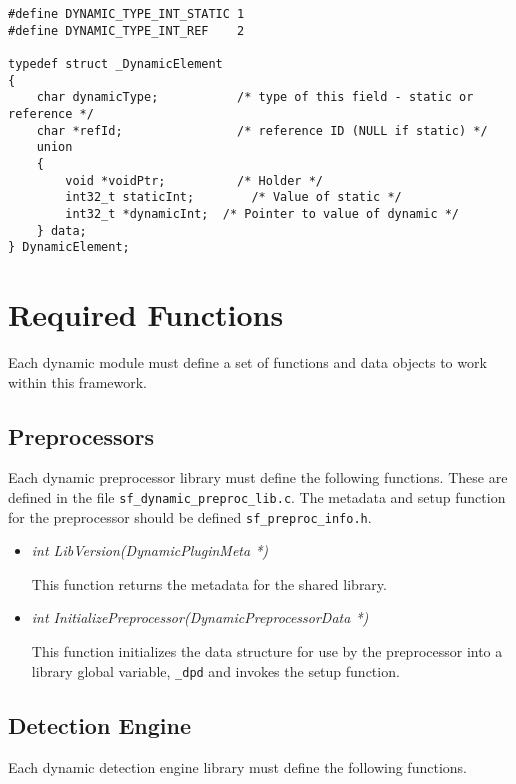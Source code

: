 \documentclass[english]{report}
\begin{document}
\begin{itemize}
\begin{verbatim}
#define DYNAMIC_TYPE_INT_STATIC 1
#define DYNAMIC_TYPE_INT_REF    2

typedef struct _DynamicElement
{
    char dynamicType;           /* type of this field - static or reference */
    char *refId;                /* reference ID (NULL if static) */
    union
    {
        void *voidPtr;          /* Holder */
        int32_t staticInt;        /* Value of static */
        int32_t *dynamicInt;  /* Pointer to value of dynamic */
    } data;
} DynamicElement;
\end{verbatim}

\end{itemize}

\section{Required Functions}

Each dynamic module must define a set of functions and data objects to work
within this framework.

\subsection{Preprocessors}

Each dynamic preprocessor library must define the following functions.  These
are defined in the file \texttt{sf\_dynamic\_preproc\_lib.c}.  The metadata and
setup function for the preprocessor should be defined
\texttt{sf\_preproc\_info.h}.

\begin{itemize}
\item {\em int LibVersion(DynamicPluginMeta *)}

This function returns the metadata for the shared library.

\item {\em int InitializePreprocessor(DynamicPreprocessorData *)}

This function initializes the data structure for use by the preprocessor into a
library global variable, \texttt{\_dpd} and invokes the setup function.

\end{itemize}

\subsection{Detection Engine}

Each dynamic detection engine library must define the following functions.
\end{document}
